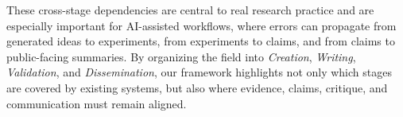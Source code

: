 \documentclass{llmxive}
\begin{document}
These cross-stage dependencies are central to real research practice and are especially important for AI-assisted workflows, where errors can propagate from generated ideas to experiments, from experiments to claims, and from claims to public-facing summaries. By organizing the field into \emph{Creation}, \emph{Writing}, \emph{Validation}, and \emph{Dissemination}, our framework highlights not only which stages are covered by existing systems, but also where evidence, claims, critique, and communication must remain aligned.




\end{document}
